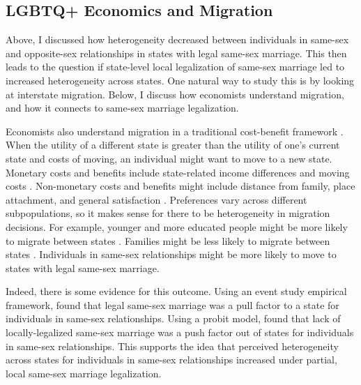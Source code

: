 \documentclass[12pt,letterpaper]{article}
\begin{document}
\subsection{LGBTQ+ Economics and Migration}
Above, I discussed how heterogeneity decreased between individuals in same-sex and opposite-sex relationships in states with legal same-sex marriage. This then leads to the question if state-level local legalization of same-sex marriage led to increased heterogeneity across states. One natural way to study this is by looking at interstate migration. Below, I discuss how economists understand migration, and how it connects to same-sex marriage legalization.

Economists also understand migration in a traditional cost-benefit framework \citep{12, 8}. When the utility of a different state is greater than the utility of one’s current state and costs of moving, an individual might want to move to a new state. Monetary costs and benefits include state-related income differences and moving costs \citep{1, 15, 16, 17}. Non-monetary costs and benefits might include distance from family, place attachment, and general satisfaction \citep{1, 15}. Preferences vary across different subpopulations, so it makes sense for there to be heterogeneity in migration decisions. For example, younger and more educated people might be more likely to migrate between states \citep{17}. Families might be less likely to migrate between states \citep{16}. Individuals in same-sex relationships might be more likely to move to states with legal same-sex marriage.


Indeed, there is some evidence for this outcome. Using an event study empirical framework, \citet{1} found that legal same-sex marriage was a pull factor to a state for individuals in same-sex relationships. Using a probit model, \citet{12} found that lack of locally-legalized same-sex marriage was a push factor out of states for individuals in same-sex relationships. This supports the idea that perceived heterogeneity across states for individuals in same-sex relationships increased under partial, local same-sex marriage legalization.

\end{document}
